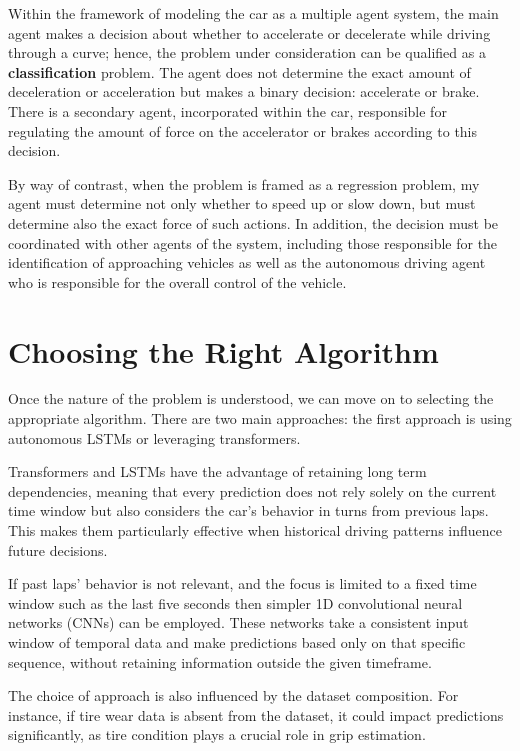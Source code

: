\documentclass[a4paper,final,12pt]{report}
\begin{document}
Within the framework of modeling the car as a multiple agent system, the main agent makes a decision about whether to accelerate or decelerate while driving through a curve; hence, the problem under consideration can be qualified as a \textbf{classification} problem. The agent does not determine the exact amount of deceleration or acceleration but makes a binary decision: accelerate or brake. There is a secondary agent, incorporated within the car, responsible for regulating the amount of force on the accelerator or brakes according to this decision.

By way of contrast, when the problem is framed as a regression problem, my agent must determine not only whether to speed up or slow down, but must determine also the exact force of such actions. In addition, the decision must be coordinated with other agents of the system, including those responsible for the identification of approaching vehicles as well as the autonomous driving agent who is responsible for the overall control of the vehicle.


\section{Choosing the Right Algorithm}

Once the nature of the problem is understood, we can move on to selecting the appropriate algorithm. There are two main approaches: the first approach is using autonomous LSTMs or leveraging transformers. 

Transformers and LSTMs have the advantage of retaining long term dependencies, meaning that every prediction does not rely solely on the current time window but also considers the car's behavior in turns from previous laps. This makes them particularly effective when historical driving patterns influence future decisions.

If past laps' behavior is not relevant, and the focus is limited to a fixed time window such as the last five seconds then simpler 1D convolutional neural networks (CNNs) can be employed. These networks take a consistent input window of temporal data and make predictions based only on that specific sequence, without retaining information outside the given timeframe.

The choice of approach is also influenced by the dataset composition. For instance, if tire wear data is absent from the dataset, it could impact predictions significantly, as tire condition plays a crucial role in grip estimation.
\end{document}
